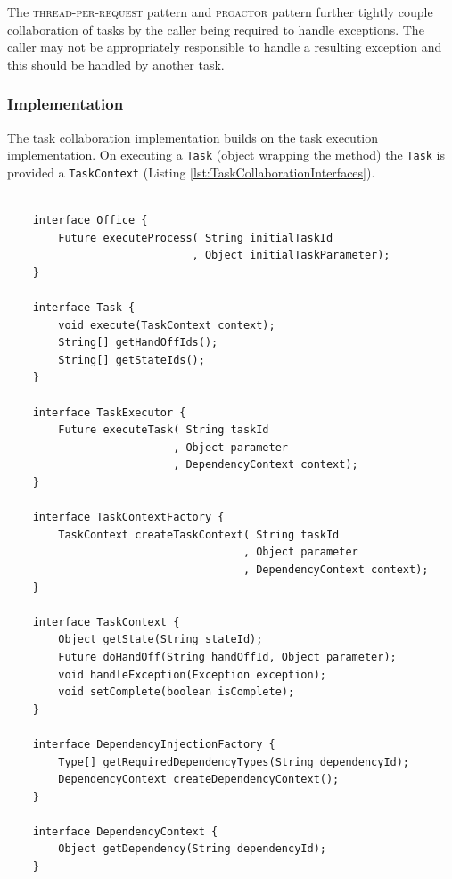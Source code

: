 \documentclass[prodmode]{style/acmlarge}
\begin{document}
The \textsc{thread-per-request} pattern and \textsc{proactor} pattern further
tightly couple collaboration of tasks by the caller being required to handle
exceptions.  The caller may not be appropriately responsible to handle a
resulting exception and this should be handled by another task.


\subsubsection*{Implementation}

The task collaboration implementation builds on the task execution
implementation.  On executing a \texttt{Task} (object wrapping the method) the
\texttt{Task} is provided a \texttt{TaskContext} (Listing
\ref{lst:TaskCollaborationInterfaces}).

\lstset{caption=Task collaboration pattern interfaces.}
\begin{lstlisting}[float,label=lst:TaskCollaborationInterfaces]

    interface Office {
        Future executeProcess( String initialTaskId
                             , Object initialTaskParameter);
    }

    interface Task {
        void execute(TaskContext context);
        String[] getHandOffIds();
        String[] getStateIds();
    }

    interface TaskExecutor {
        Future executeTask( String taskId 
                          , Object parameter
                          , DependencyContext context);
    }

    interface TaskContextFactory {
        TaskContext createTaskContext( String taskId
                                     , Object parameter
                                     , DependencyContext context);
    }

    interface TaskContext {
        Object getState(String stateId);
        Future doHandOff(String handOffId, Object parameter);
        void handleException(Exception exception);
        void setComplete(boolean isComplete);
    }

    interface DependencyInjectionFactory {
        Type[] getRequiredDependencyTypes(String dependencyId);
        DependencyContext createDependencyContext();
    }
    
    interface DependencyContext {
        Object getDependency(String dependencyId);
    }
\end{lstlisting}
\end{document}
